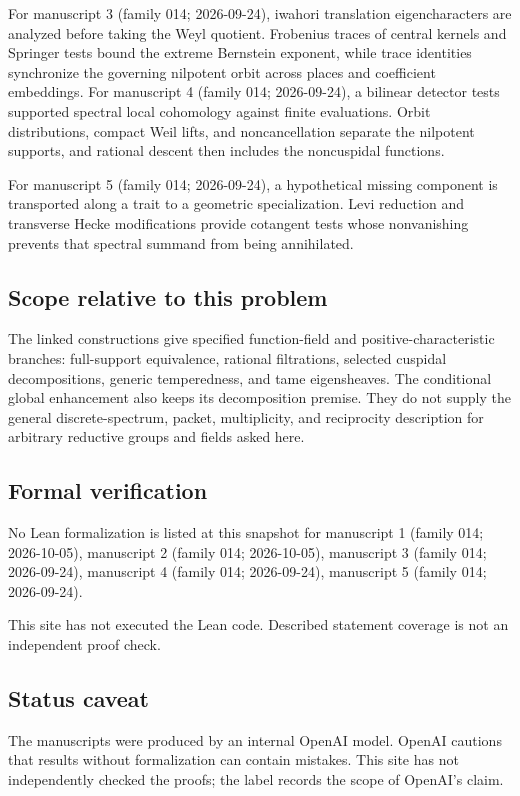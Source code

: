\documentclass[11pt]{article}
\begin{document}
For manuscript 3 (family 014; 2026-09-24), iwahori translation eigencharacters are analyzed before taking the Weyl quotient. Frobenius traces of central kernels and Springer tests bound the extreme Bernstein exponent, while trace identities synchronize the governing nilpotent orbit across places and coefficient embeddings. For manuscript 4 (family 014; 2026-09-24), a bilinear detector tests supported spectral local cohomology against finite evaluations. Orbit distributions, compact Weil lifts, and noncancellation separate the nilpotent supports, and rational descent then includes the noncuspidal functions.

For manuscript 5 (family 014; 2026-09-24), a hypothetical missing component is transported along a trait to a geometric specialization. Levi reduction and transverse Hecke modifications provide cotangent tests whose nonvanishing prevents that spectral summand from being annihilated.

\subsection{Scope relative to this problem}
The linked constructions give specified function-field and positive-characteristic branches: full-support equivalence, rational filtrations, selected cuspidal decompositions, generic temperedness, and tame eigensheaves. The conditional global enhancement also keeps its decomposition premise. They do not supply the general discrete-spectrum, packet, multiplicity, and reciprocity description for arbitrary reductive groups and fields asked here.

\subsection{Formal verification}
No Lean formalization is listed at this snapshot for manuscript 1 (family 014; 2026-10-05), manuscript 2 (family 014; 2026-10-05), manuscript 3 (family 014; 2026-09-24), manuscript 4 (family 014; 2026-09-24), manuscript 5 (family 014; 2026-09-24).

This site has not executed the Lean code. Described statement coverage is not an independent proof check.

\subsection{Status caveat}
The manuscripts were produced by an internal OpenAI model. OpenAI cautions that results without formalization can contain mistakes. This site has not independently checked the proofs; the label records the scope of OpenAI's claim.
\end{document}
